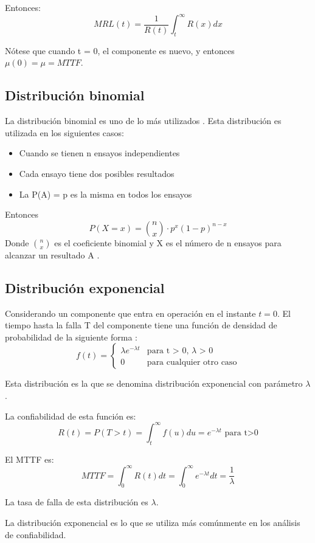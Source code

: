 Entonces: $$MRL(t) = \frac{1}{R(t)}\int_t^\infty R(x)dx$$

Nótese que cuando t = 0, el componente es nuevo, y entonces $\mu(0) = \mu = MTTF$.

\subsection{Distribución binomial}
La distribución binomial es uno de lo más utilizados \citep{Rausand04}. Esta distribución es utilizada en los siguientes casos:
\begin{itemize}
  \item Cuando se tienen n ensayos independientes
  \item Cada ensayo tiene dos posibles resultados
  \item La P(A) = p es la misma en todos los ensayos
\end{itemize}

Entonces $$P(X=x) = {{n}\choose{x}} \cdot p^x (1-p)^{n-x}$$ Donde ${n}\choose{x}$ es el coeficiente binomial y X es el número de n ensayos para alcanzar un resultado A \citep{Rausand04}.

\subsection{Distribución exponencial}
Considerando un componente que entra en operación en el instante $t=0$. El tiempo hasta la falla T del componente tiene una función de densidad de probabilidad de la siguiente forma \cite{Rausand04}:
$$ f(t) =\left \{
\begin{matrix}
  \lambda e^{ -\lambda t } & \text{para t > 0, } \lambda \text{ > 0}\\
  0                      & \text{para cualquier otro caso}
\end{matrix}
$$

Esta distribución es la que se denomina distribución exponencial con parámetro $\lambda$.

La confiabilidad de esta función  es: $$R(t) = P (T>t) = \int_t^\infty f(u) du  = e^{ - \lambda t} \text{ para t>0} $$

El \ac{MTTF} es: $$MTTF = \int_0^\infty R(t) dt = \int_0^\infty e^{ - \lambda t} dt  = \frac{1}{\lambda}$$

La tasa de falla de esta distribución es $\lambda$.

La distribución exponencial es lo que se utiliza más comúnmente en los análisis de confiabilidad.

